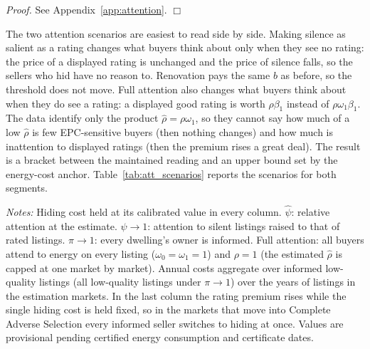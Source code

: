 \documentclass[10pt,letterpaper]{bp-template-concise}
\begin{document}
\noindent\textit{Proof.} See Appendix~\ref{app:attention}. $\Box$

\medskip

The two attention scenarios are easiest to read side by side. Making silence as salient as a rating changes what buyers think about only when they see no rating: the price of a displayed rating is unchanged and the price of silence falls, so the sellers who hid have no reason to. Renovation pays the same $b$ as before, so the threshold does not move. Full attention also changes what buyers think about when they do see a rating: a displayed good rating is worth $\rho\beta_1$ instead of $\rho\omega_1\beta_1$. The data identify only the product $\hat\rho=\rho\omega_1$, so they cannot say how much of a low $\hat\rho$ is few EPC-sensitive buyers (then nothing changes) and how much is inattention to displayed ratings (then the premium rises a great deal). The result is a bracket between the maintained reading and an upper bound set by the energy-cost anchor. Table~\ref{tab:att_scenarios} reports the scenarios for both segments.

\begin{table}[htbp]
\centering
\caption{Policy Scenarios under Limited Attention}
\label{tab:att_scenarios}
\small\renewcommand{\arraystretch}{1.3}


\vspace{0.5em}
\raggedright
\footnotesize
\textit{Notes:} Hiding cost held at its calibrated value in every column. $\hat\psi$: relative attention at the estimate. $\psi\to1$: attention to silent listings raised to that of rated listings. $\pi\to1$: every dwelling's owner is informed. Full attention: all buyers attend to energy on every listing ($\omega_0=\omega_1=1$) and $\rho=1$ (the estimated $\hat\rho$ is capped at one market by market). Annual costs aggregate over informed low-quality listings (all low-quality listings under $\pi\to1$) over the \attSampleYears{} years of listings in the estimation markets. In the last column the rating premium rises while the single hiding cost is held fixed, so in the markets that move into Complete Adverse Selection every informed seller switches to hiding at once. Values are provisional pending certified energy consumption and certificate dates.
\end{table}
\end{document}
